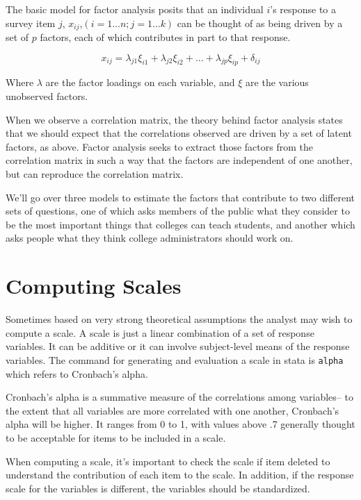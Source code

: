 \documentclass[12pt]{article}
\begin{document}
The basic model for factor analysis posits that an individual $i$'s 
response to a survey item $j$, $x_{ij}$,$(i=1 \ldots n;j=1 \ldots k)$ can
be thought of as being driven by a set of $p$ factors, each of which
contributes in part to that response.

\begin{equation*}
  x_{ij}= \lambda_{j1} \xi_{i1}+ \lambda_{j2} \xi_{i2}+ \ldots +
  \lambda_{jp} \xi_{ip}+\delta_{ij}
\end{equation*}

Where $\lambda$ are the factor loadings on each variable, and $\xi$
are the various unobserved factors. 

When we observe a correlation matrix, the theory behind factor
analysis states that we should expect that the correlations observed
are driven by a set of latent factors, as above. Factor analysis seeks
to extract those factors from the correlation matrix in such a way
that the factors are independent of one another, but can reproduce the
correlation matrix. 

We'll go over three models to estimate the factors that contribute to
two different sets of questions, one of which asks members of the
public what they consider to be the most important things that
colleges can teach students, and another which asks people what they
think college administrators should work on. 


\section{Computing Scales}
\label{sec:computing-scales}

Sometimes based on very strong theoretical assumptions the analyst may
wish to compute a scale. A scale is just a linear combination of a set
of response variables. It can be additive or it can involve
subject-level means of the response variables. The command for
generating and evaluation a scale in stata is \texttt{alpha} which
refers to Cronbach's alpha.

Cronbach's alpha is a summative measure of the correlations among
variables-- to the extent that all variables are more correlated with
one another, Cronbach's alpha will be higher. It ranges from 0 to 1,
with values above .7 generally thought to be acceptable for items to
be included in a scale.

When computing a scale, it's important to check the scale if item
deleted to understand the contribution of each item to the scale. In
addition, if the response scale for the variables is different, the
variables should be standardized. 
\end{document}
